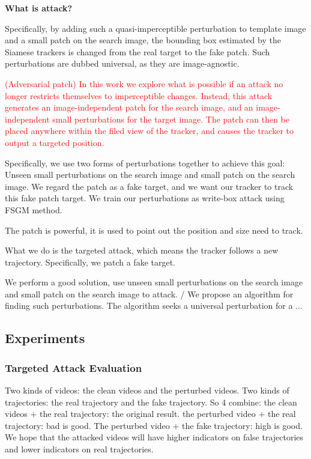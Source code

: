 \documentclass{article}
\begin{document}
\textbf{What is attack?}

Specifically, by adding such a quasi-imperceptible perturbation to template image and a small patch on the search image, the bounding box estimated by the Siamese trackers is changed from the real target to the fake patch. Such perturbations are dubbed universal, as they are image-agnostic.

\textcolor{red}{(Adversarial patch) In this work we explore what is possible if an attack no longer restricts themselves to imperceptible changes. Instead, this attack generates an image-independent patch for the search image, and an image-independent small perturbations for the target image. The patch can then be placed anywhere within the filed view of the tracker, and causes the tracker to output a targeted position.}

Specifically, we use two forms of perturbations together to achieve this goal: Unseen small perturbations on the search image and small patch on the search image. We regard the patch as a fake target, and we want our tracker to track this fake patch target. We train our perturbations as write-box attack using FSGM  method.

The patch is powerful, it is used to point out the position and size need to track.

What we do is the targeted attack, which means the tracker follows a new trajectory. Specifically, we patch a fake target.

We perform a good solution, use unseen small perturbations on the search image and small patch on the search image to attack. / We propose an algorithm for finding such perturbations. The algorithm seeks a universal perturbation for a ...

\subsection{Experiments}

\subsubsection{Targeted Attack Evaluation}

Two kinds of videos: the clean videos and the perturbed videos.
Two kinds of trajectories: the real trajectory and the fake trajectory.
So 4 combine: the clean videos + the real trajectory: the original result.
the perturbed video + the real trajectory: bad is good.
The perturbed video + the fake trajectory: high is good.
We hope that the attacked videos will have higher indicators on false trajectories and lower indicators on real trajectories.
\end{document}

